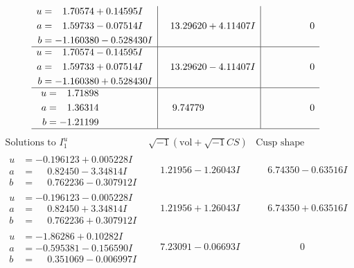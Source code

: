 \documentclass[1p]{elsarticle_modified}
\theoremstyle{definition}
\newcommand{\I}{\sqrt{-1}}
\begin{document}
$$\begin{array}{c|c|c}
\begin{aligned}
u &= \phantom{-}1.70574 + 0.14595 I \\
a &= \phantom{-}1.59733 - 0.07514 I \\
b &= -1.160380 - 0.528430 I\end{aligned}
 & \phantom{-}13.29620 + 4.11407 I & \phantom{-0.000000 } 0 \\ \hline\begin{aligned}
u &= \phantom{-}1.70574 - 0.14595 I \\
a &= \phantom{-}1.59733 + 0.07514 I \\
b &= -1.160380 + 0.528430 I\end{aligned}
 & \phantom{-}13.29620 - 4.11407 I & \phantom{-0.000000 } 0 \\ \hline\begin{aligned}
u &= \phantom{-}1.71898\phantom{ +0.000000I} \\
a &= \phantom{-}1.36314\phantom{ +0.000000I} \\
b &= -1.21199\phantom{ +0.000000I}\end{aligned}
 & \phantom{-}9.74779\phantom{ +0.000000I} & \phantom{-0.000000 } 0\\
 \hline 
 \end{array}$$\newpage$$\begin{array}{c|c|c}  
\text{Solutions to }I^u_{1}& \I (\text{vol} + \sqrt{-1}CS) & \text{Cusp shape}\\
 \hline 
\begin{aligned}
u &= -0.196123 + 0.005228 I \\
a &= \phantom{-}0.82450 - 3.34814 I \\
b &= \phantom{-}0.762236 - 0.307912 I\end{aligned}
 & \phantom{-}1.21956 - 1.26043 I & \phantom{-}6.74350 - 0.63516 I \\ \hline\begin{aligned}
u &= -0.196123 - 0.005228 I \\
a &= \phantom{-}0.82450 + 3.34814 I \\
b &= \phantom{-}0.762236 + 0.307912 I\end{aligned}
 & \phantom{-}1.21956 + 1.26043 I & \phantom{-}6.74350 + 0.63516 I \\ \hline\begin{aligned}
u &= -1.86286 + 0.10282 I \\
a &= -0.595381 - 0.156590 I \\
b &= \phantom{-}0.351069 - 0.006997 I\end{aligned}
 & \phantom{-}7.23091 - 0.06693 I & \phantom{-0.000000 } 0 \\ \hline\begin{aligned}

\end{aligned}
\end{array}$$
\end{document}
